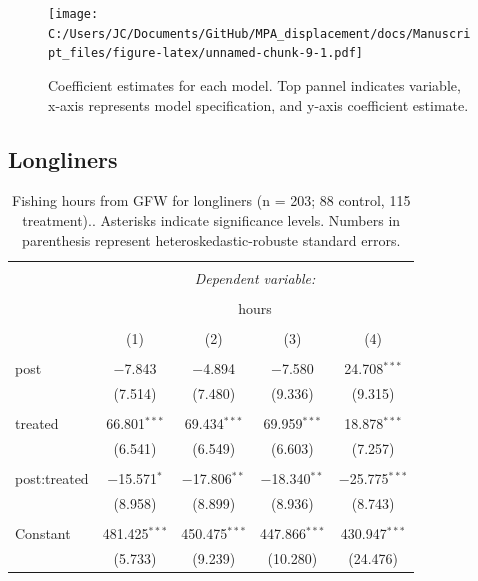 \documentclass[]{article}
\begin{document}
\begin{figure}
\centering
\texttt{[image: C:/Users/JC/Documents/GitHub/MPA\_displacement/docs/Manuscript\_files/figure-latex/unnamed-chunk-9-1.pdf]}
\caption{\label{fig:unnamed-chunk-9}\label{fig:puse}Coefficient estimates
for each model. Top pannel indicates variable, x-axis represents model
specification, and y-axis coefficient estimate.}
\end{figure}

\clearpage

\subsection{Longliners}\label{longliners}

\begin{table}[!htbp] \centering 
  \caption{\label{tab:long}Fishing hours from GFW for longliners (n = 203; 88 control, 115 treatment).. Asterisks indicate significance levels. Numbers in parenthesis represent heteroskedastic-robuste standard errors.} 
  \label{} 
\begin{tabular}{@{\extracolsep{5pt}}lcccc} 
\\[-1.8ex]\hline 
\hline \\[-1.8ex] 
 & \multicolumn{4}{c}{\textit{Dependent variable:}} \\ 
\cline{2-5} 
\\[-1.8ex] & \multicolumn{4}{c}{hours} \\ 
\\[-1.8ex] & (1) & (2) & (3) & (4)\\ 
\hline \\[-1.8ex] 
 post & $-$7.843 & $-$4.894 & $-$7.580 & 24.708$^{***}$ \\ 
  & (7.514) & (7.480) & (9.336) & (9.315) \\ 
  & & & & \\ 
 treated & 66.801$^{***}$ & 69.434$^{***}$ & 69.959$^{***}$ & 18.878$^{***}$ \\ 
  & (6.541) & (6.549) & (6.603) & (7.257) \\ 
  & & & & \\ 
 post:treated & $-$15.571$^{*}$ & $-$17.806$^{**}$ & $-$18.340$^{**}$ & $-$25.775$^{***}$ \\ 
  & (8.958) & (8.899) & (8.936) & (8.743) \\ 
  & & & & \\ 
 Constant & 481.425$^{***}$ & 450.475$^{***}$ & 447.866$^{***}$ & 430.947$^{***}$ \\ 
  & (5.733) & (9.239) & (10.280) & (24.476) \\ 

\end{tabular}
\end{table}
\end{document}
